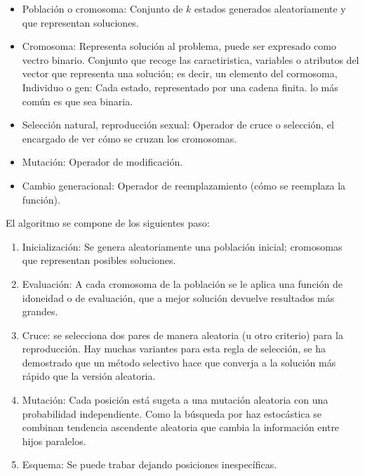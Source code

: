 \documentclass[12 pt, a4paper]{article}
\begin{document}
\begin{itemize}
  \item Población o cromosoma: Conjunto de $k$ estados generados aleatoriamente y que representan soluciones. 
  \item Cromosoma: Representa solución al problema, puede ser expresado como vectro binario. 
  Conjunto que recoge las caractiristica, variables o atributos del vector que representa una solución; es decir,  un elemento del cormosoma,  Individuo o gen: Cada estado, representado por una cadena finita. 
  lo más común es que sea binaria. 
  \item Selección natural, reproducción sexual: Operador de cruce o selección, el encargado de ver cómo se cruzan los cromosomas.
  \item Mutación: Operador de modificación. 
  \item Cambio generacional: Operador de reemplazamiento (cómo se reemplaza la función). 
  
\end{itemize}

El algoritmo se compone de los siguientes paso: 
\begin{enumerate}
  \item Inicialización: Se genera aleatoriamente una población inicial; cromosomas que representan posibles soluciones. 

\item Evaluación: A cada cromosoma de la población se le aplica una función de idoneidad o de evaluación, que a mejor solución devuelve resultados 
más grandes. 

\item Cruce: se selecciona dos pares de manera aleatoria (u otro criterio) para la reproducción. Hay muchas variantes para
esta regla de selección, se ha demostrado que un método selectivo hace que converja a la solución 
más rápido que la versión aleatoria.

\item Mutación: Cada posición está sugeta a una mutación aleatoria con una probabilidad independiente. 
Como la búsqueda por haz estocástica se combinan tendencia ascendente aleatoria que cambia la información entre hijos paralelos. 

\item Esquema: Se puede trabar dejando posiciones inespecíficas. 
\end{enumerate}


\end{document}

